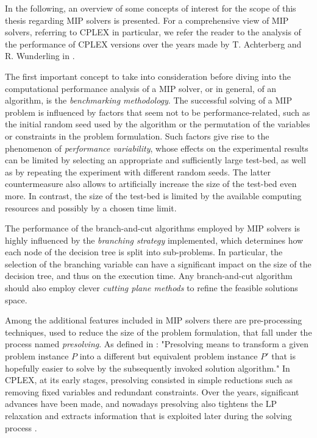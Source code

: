 \documentclass[a4paper,12pt,twoside]{scrbook}
\begin{document}
In the following, an overview of some concepts of interest for the scope of this thesis regarding MIP solvers is presented. For a comprehensive view of MIP solvers, referring to CPLEX in particular, we refer the reader to the analysis of the performance of CPLEX versions over the years made by T. Achterberg and R. Wunderling in \cite{achterberg2013}. \par

The first important concept to take into consideration before diving into the computational performance analysis of a MIP solver, or in general, of an algorithm, is the \textit{benchmarking methodology}. The successful solving of a MIP problem is influenced by factors that seem not to be performance-related, such as the initial random seed used by the algorithm or the permutation of the variables or constraints in the problem formulation. Such factors give rise to the phenomenon of \textit{performance variability}, whose effects on the experimental results can be limited by selecting an appropriate and sufficiently large test-bed, as well as by repeating the experiment with different random seeds. The latter countermeasure also allows to artificially increase the size of the test-bed even more. In contrast, the size of the test-bed is limited by the available computing resources and possibly by a chosen time limit. \par 

The performance of the branch-and-cut algorithms employed by MIP solvers is highly influenced by the \textit{branching strategy} implemented, which determines how each node of the decision tree is split into sub-problems. In particular, the selection of the branching variable can have a significant impact on the size of the decision tree, and thus on the execution time.
Any branch-and-cut algorithm should also employ clever \textit{cutting plane methods} to refine the feasible solutions space. \par 

Among the additional features included in MIP solvers there are pre-processing techniques, used to reduce the size of the problem formulation, that fall under the process named \textit{presolving}.
As defined in \cite{achterberg2013}:
	"Presolving means to transform a given problem instance $P$ into a
	different but equivalent problem instance $P'$ that is hopefully easier to solve by the subsequently invoked solution algorithm."
In CPLEX, at its early stages, presolving consisted in simple reductions such as removing fixed variables and redundant constraints. Over the years, significant advances have been made, and nowadays presolving also tightens the LP relaxation and extracts information that is exploited later during the solving process \cite{achterberg2013}. \par 
\end{document}
